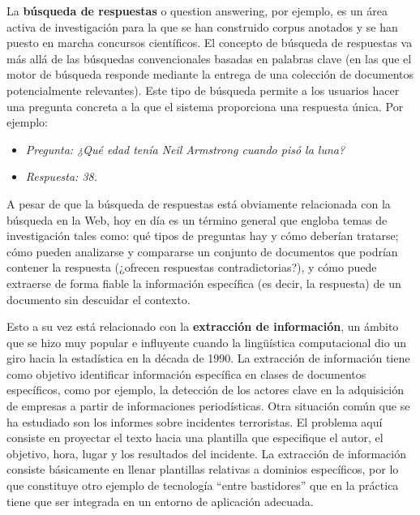 \begin{multicols}{2}
La \textbf{búsqueda de respuestas} o question answering, por ejemplo, es un área activa de investigación para la que se han construido corpus anotados y se han puesto en marcha concursos científicos. El concepto de búsqueda de respuestas va más allá de las búsquedas convencionales basadas en palabras clave (en las que el motor de búsqueda responde mediante la entrega de una colección de documentos potencialmente relevantes). Este tipo de búsqueda permite a los usuarios hacer una pregunta concreta a la que el sistema proporciona una respuesta única. Por ejemplo:

\begin{itemize}
  \item[] \textit{Pregunta: ¿Qué edad tenía Neil Armstrong cuando pisó la luna?}
  \item[] \textit{Respuesta: 38.}
\end{itemize}

A pesar de que la búsqueda de respuestas está obviamente relacionada con la búsqueda en la Web, hoy en día es un término general que engloba temas de investigación tales como: qué tipos de preguntas hay y cómo deberían tratarse; cómo pueden analizarse y compararse un conjunto de documentos que podrían contener la respuesta (¿ofrecen respuestas contradictorias?), y cómo puede extraerse de forma fiable la información específica (es decir, la respuesta) de un documento sin descuidar el contexto. 

 
Esto a su vez está relacionado con la \textbf{extracción de información}, un ámbito que se hizo muy popular e influyente cuando la lingüística computacional dio un giro hacia la estadística en la década de 1990. La extracción de información tiene como objetivo identificar información específica en clases de documentos específicos, como por ejemplo, la detección de los actores clave en la adquisición de empresas a partir de informaciones periodísticas. Otra situación común que se ha estudiado son los informes sobre incidentes terroristas. El problema aquí consiste en proyectar el texto hacia una plantilla que especifique el autor, el objetivo, hora, lugar y los resultados del incidente. La extracción de información consiste básicamente en llenar plantillas relativas a dominios específicos, por lo que constituye otro ejemplo de tecnología “entre bastidores” que en la práctica tiene que ser integrada en un entorno de aplicación adecuada. 


\end{multicols}

